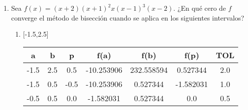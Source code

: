 \documentclass[12pt]{article}
\begin{document}
\begin{enumerate}
    \item Sea \(f(x) = (x+2) (x+1)^{2}x(x-1)^{3}(x-2)\). ¿En qué cero de \(f\) converge el método de bisección cuando
    se aplica en los siguientes intervalos?
    \begin{enumerate}[label=\alph*]
        \item {[-1.5,2.5]}\\
        \begin{tabular}{|c|c|c|c|c|c|c|}
            \hline
            \textbf{a} & \textbf{b} & \textbf{p} & \textbf{f(a)} & \textbf{f(b)} & \textbf{f(p)} & \textbf{TOL}\\ \hline
            -1.5 & 2.5 & 0.5 & -10.253906 & 232.558594 & 0.527344 & 2.0 \\
            -1.5 & 0.5 & -0.5 & -10.253906 & 0.527344 & -1.582031 & 1.0 \\
            -0.5 & 0.5 & 0.0 & -1.582031 & 0.527344 & 0.0 & 0.5 \\
            \hline
        \end{tabular}
        

\end{enumerate}
\end{enumerate}
\end{document}
